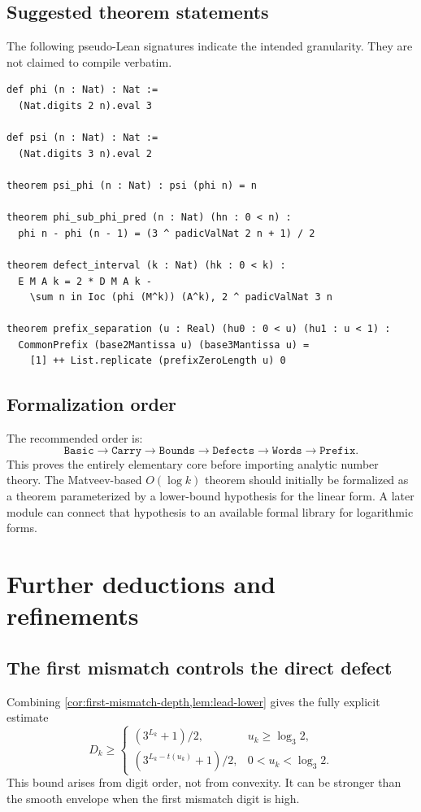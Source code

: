 \documentclass[11pt]{article}
\theoremstyle{definition}
\begin{document}
\subsection{Suggested theorem statements}

The following pseudo-Lean signatures indicate the intended granularity.
They are not claimed to compile verbatim.

\begin{verbatim}
def phi (n : Nat) : Nat :=
  (Nat.digits 2 n).eval 3

def psi (n : Nat) : Nat :=
  (Nat.digits 3 n).eval 2

theorem psi_phi (n : Nat) : psi (phi n) = n

theorem phi_sub_phi_pred (n : Nat) (hn : 0 < n) :
  phi n - phi (n - 1) = (3 ^ padicValNat 2 n + 1) / 2

theorem defect_interval (k : Nat) (hk : 0 < k) :
  E M A k = 2 * D M A k -
    \sum n in Ioc (phi (M^k)) (A^k), 2 ^ padicValNat 3 n

theorem prefix_separation (u : Real) (hu0 : 0 < u) (hu1 : u < 1) :
  CommonPrefix (base2Mantissa u) (base3Mantissa u) =
    [1] ++ List.replicate (prefixZeroLength u) 0
\end{verbatim}

\subsection{Formalization order}

The recommended order is:
\[
 \texttt{Basic}
 \to\texttt{Carry}
 \to\texttt{Bounds}
 \to\texttt{Defects}
 \to\texttt{Words}
 \to\texttt{Prefix}.
\]
This proves the entirely elementary core before importing analytic number
theory.  The Matveev-based \(O(\log k)\) theorem should initially be
formalized as a theorem parameterized by a lower-bound hypothesis for the
linear form.  A later module can connect that hypothesis to an available
formal library for logarithmic forms.

\section{Further deductions and refinements}
\label{sec:further}

\subsection{The first mismatch controls the direct defect}

Combining \cref{cor:first-mismatch-depth,lem:lead-lower} gives the fully
explicit estimate
\begin{equation}\label{eq:D-explicit-u}
 D_k\ge
 \begin{cases}
 (3^{L_k}+1)/2,
   &u_k\ge\log_3 2,\\[3pt]
 (3^{L_k-t(u_k)}+1)/2,
   &0<u_k<\log_3 2.
 \end{cases}
\end{equation}
This bound arises from digit order, not from convexity.  It can be stronger
than the smooth envelope when the first mismatch digit is high.
\end{document}
